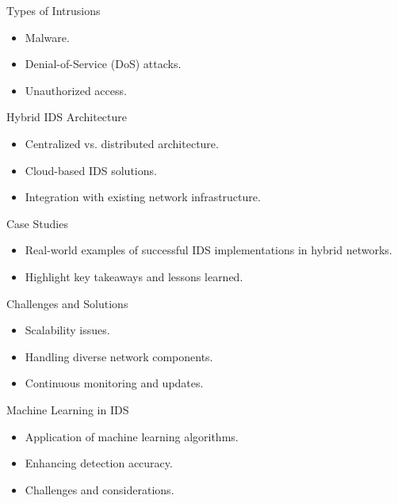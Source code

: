 \documentclass{beamer}
\begin{document}
\begin{frame}{Types of Intrusions}
    \begin{itemize}
        \item Malware.
        \item Denial-of-Service (DoS) attacks.
        \item Unauthorized access.
    \end{itemize}
\end{frame}


\begin{frame}{Hybrid IDS Architecture}
    \begin{itemize}
        \item Centralized vs. distributed architecture.
        \item Cloud-based IDS solutions.
        \item Integration with existing network infrastructure.
    \end{itemize}
\end{frame}


\begin{frame}{Case Studies}
    \begin{itemize}
        \item Real-world examples of successful IDS implementations in hybrid networks.
        \item Highlight key takeaways and lessons learned.
    \end{itemize}
\end{frame}


\begin{frame}{Challenges and Solutions}
    \begin{itemize}
        \item Scalability issues.
        \item Handling diverse network components.
        \item Continuous monitoring and updates.
    \end{itemize}
\end{frame}


\begin{frame}{Machine Learning in IDS}
    \begin{itemize}
        \item Application of machine learning algorithms.
        \item Enhancing detection accuracy.
        \item Challenges and considerations.
    \end{itemize}
\end{frame}
\end{document}
